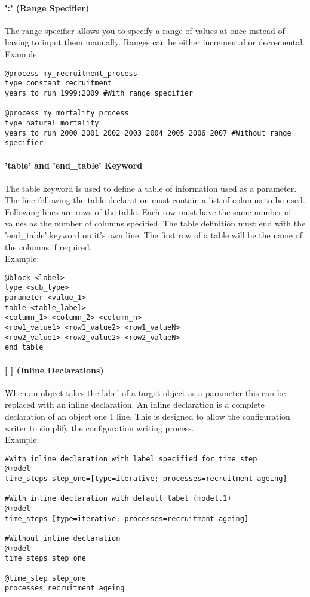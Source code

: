 \paragraph*{':' (Range Specifier)}
The range specifier allows you to specify a range of values at once instead of having to input them manually. Ranges can be either incremental or decremental.\\
Example:
{\small{\begin{verbatim}
@process my_recruitment_process
type constant_recruitment
years_to_run 1999:2009 #With range specifier

@process my_mortality_process
type natural_mortality
years_to_run 2000 2001 2002 2003 2004 2005 2006 2007 #Without range specifier
\end{verbatim}}}


\paragraph*{'table' and 'end\_table' Keyword}
The table keyword is used to define a table of information used as a parameter. The line following the table declaration must contain a list of columns to be used. Following lines are rows of the table. Each row must have the same number of values as the number of columns specified.
The table definition must end with the 'end\_table' keyword on it's own line.
The first row of a table will be the name of the columns if required.\\
Example:
{\small{\begin{verbatim}
@block <label>
type <sub_type>
parameter <value_1>
table <table_label>
<column_1> <column_2> <column_n>
<row1_value1> <row1_value2> <row1_valueN>
<row2_value1> <row2_value2> <row2_valueN>
end_table
\end{verbatim}}}

\paragraph*{[ ] (Inline Declarations)}
When an object takes the label of a target object as a parameter this can be replaced with an inline declaration. An inline declaration is a complete declaration of an object one 1 line. This is designed to allow the configuration writer to simplify the configuration writing process.\\
Example:
{\small{\begin{verbatim}
#With inline declaration with label specified for time step
@model
time_steps step_one=[type=iterative; processes=recruitment ageing]

#With inline declaration with default label (model.1)
@model
time_steps [type=iterative; processes=recruitment ageing]

#Without inline declaration
@model
time_steps step_one

@time_step step_one
processes recruitment ageing
\end{verbatim}}}


